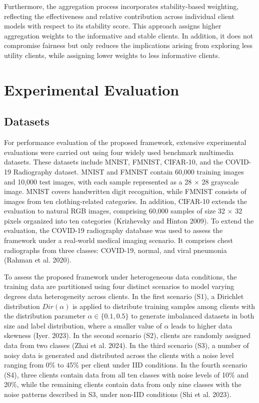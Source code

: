 \documentclass[pdflatex,sn-mathphys-num,oneside]{sn-jnl}%
\theoremstyle{thmstyleone}%
\theoremstyle{thmstyletwo}%
\theoremstyle{thmstylethree}%
\begin{document}
Furthermore, the aggregation process incorporates stability-based weighting, reflecting the effectiveness and relative contribution across individual client models with respect to its stability score. This approach assigns higher aggregation weights to the informative and stable clients. In addition, it does not compromise fairness but only reduces the implications arising from exploring less utility clients, while assigning lower weights to less informative clients.

\section{Experimental Evaluation}\label{sec5}

\subsection{Datasets}

For performance evaluation of the proposed framework, extensive experimental evaluations were carried out using four widely used benchmark multimedia datasets. These datasets include MNIST, FMNIST, CIFAR-10, and the COVID-19 Radiography dataset. MNIST and FMNIST contain 60,000 training images and 10,000 test images, with each sample represented as a 28 \ensuremath{\times} 28 grayscale image. MNIST covers handwritten digit recognition, while FMNIST consists of images from ten clothing-related categories. In addition, CIFAR-10 extends the evaluation to natural RGB images, comprising 60,000 samples of size 32 \ensuremath{\times} 32 pixels organized into ten categories (Krizhevsky and Hinton 2009). To extend the evaluation, the COVID-19 radiography database was used to assess the framework under a real-world medical imaging scenario. It comprises chest radiographs from three classes: COVID-19, normal, and viral pneumonia (Rahman et al. 2020).  

To assess the proposed framework under heterogeneous data conditions, the training data are partitioned using four distinct scenarios to model varying degrees data heterogeneity across clients. In the first scenario (S1), a Dirichlet distribution $\mathrm{\textit{Dir}}(\alpha)$ is applied to distribute training samples among clients with the distribution parameter $\alpha \in \{0.1, 0.5\}$ to generate imbalanced datasets in both size and label distribution, where a smaller value of $\alpha$ leads to higher data skewness (Iyer. 2023). In the second scenario (S2), clients are randomly assigned data from two classes (Zhai et al. 2024). In the third scenario (S3), a number of noisy data is generated and distributed across the clients with a noise level ranging from 0\% to 45\% per client under IID conditions. In the fourth scenario (S4), three clients contain data from all ten classes with noise levels of 10\% and 20\%, while the remaining clients contain data from only nine classes with the noise patterns described in S3, under non-IID conditions (Shi et al. 2023).
\end{document}

